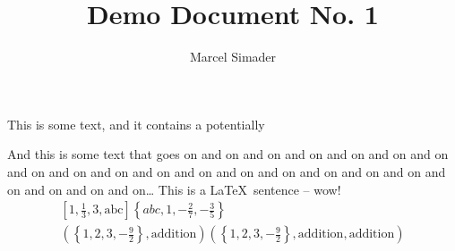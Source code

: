 \documentclass[a4paper, 12pt]{article}
\title{Demo Document No. 1\\[0.4em]\smaller{for the SEPTeX module}}
\author{Marcel Simader}
\begin{document}
	\maketitle
	
	\noindent This is some text, and it contains a potentially %
	
	And this is some text that goes on and on and on and on and on and on and on and on and on and on and on and on and on and
 on and on and on and on and on and on and on and on\ldots
	This is a \LaTeX\ sentence -- wow!
	\begin{gather*}
		\left[ 1, \frac{1}{3}, 3, \text{abc} \right]
		\left\{ abc, 1, -\frac{2}{7}, -\frac{3}{5} \right\}
		\\
		\left( \left\{ 1, 2, 3, -\frac{9}{2} \right\}, \text{addition} \right)
		\left( \left\{ 1, 2, 3, -\frac{9}{2} \right\}, \text{addition}, \text{addition} \right)
	\end{gather*}
	
	\newpage
	
\end{document}
